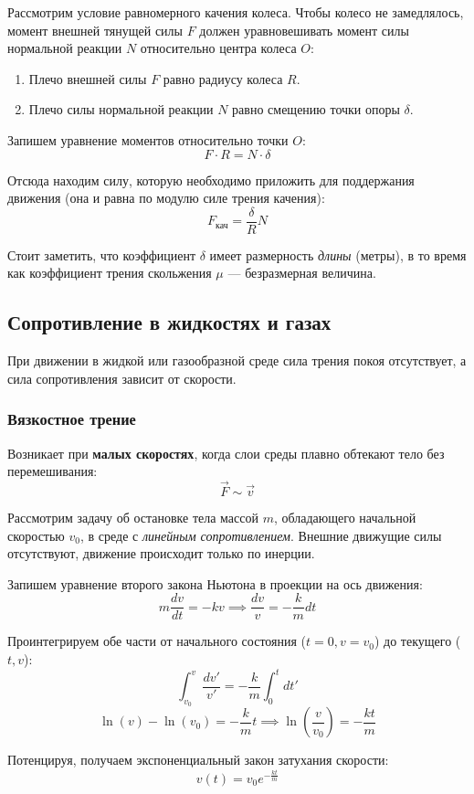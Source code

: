 Рассмотрим условие равномерного качения колеса. Чтобы колесо не замедлялось, момент внешней тянущей силы $F$ должен уравновешивать момент силы нормальной реакции $N$ относительно центра колеса $O$:
\begin{enumerate}
\item Плечо внешней силы $F$ равно радиусу колеса $R$.
\item Плечо силы нормальной реакции $N$ равно смещению точки опоры $\delta$.
\end{enumerate}

Запишем уравнение моментов относительно точки $O$:
$$F \cdot R = N \cdot \delta$$

Отсюда находим силу, которую необходимо приложить для поддержания движения (она и равна по модулю силе трения качения):
$$\boxed{F_{\text{кач}} = \frac{\delta}{R} N}$$

Стоит заметить, что коэффициент $\delta$ имеет размерность \textit{длины} (метры), в то время как коэффициент трения скольжения $\mu$ --- безразмерная величина. 

\subsection{Сопротивление в жидкостях и газах}
При движении в жидкой или газообразной среде сила трения покоя отсутствует, а сила сопротивления зависит от скорости.

\subsubsection{Вязкостное трение}
Возникает при \textbf{малых скоростях}, когда слои среды плавно обтекают тело без перемешивания:
\[ \vec{F} \sim \vec{v} \]

Рассмотрим задачу об остановке тела массой $m$, обладающего начальной скоростью $v_0$, в среде с \textit{линейным сопротивлением}. Внешние движущие силы отсутствуют, движение происходит только по инерции.

Запишем уравнение второго закона Ньютона в проекции на ось движения:
\[ m \frac{dv}{dt} = -kv\implies \frac{dv}{v} = -\frac{k}{m} dt \]

Проинтегрируем обе части от начального состояния ($t=0, v=v_0$) до текущего ($t, v$):
\[ \int_{v_0}^{v} \frac{dv'}{v'} = -\frac{k}{m} \int_{0}^{t} dt' \]
\[ \ln(v) - \ln(v_0) = -\frac{k}{m}t \implies \ln\left(\frac{v}{v_0}\right) = -\frac{kt}{m} \]

Потенцируя, получаем экспоненциальный закон затухания скорости:
\[
v(t) = v_0 e^{-\frac{kt}{m}}
\]

